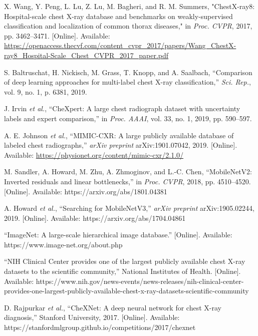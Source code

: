 \documentclass[12pt]{article}
\begin{document}
\begin{thebibliography}{99}
X. Wang, Y. Peng, L. Lu, Z. Lu, M. Bagheri, and R. M. Summers, "ChestX-ray8: Hospital-scale chest X-ray database and benchmarks on weakly-supervised classification and localization of common thorax diseases," in \textit{Proc. CVPR}, 2017, pp. 3462–3471. [Online]. Available: \url{https://openaccess.thecvf.com/content_cvpr_2017/papers/Wang_ChestX-ray8_Hospital-Scale_Chest_CVPR_2017_paper.pdf}

S. Baltruschat, H. Nickisch, M. Grass, T. Knopp, and A. Saalbach, “Comparison of deep learning approaches for multi-label chest X-ray classification,” \textit{Sci. Rep.}, vol. 9, no. 1, p. 6381, 2019.

J. Irvin \textit{et al.}, “CheXpert: A large chest radiograph dataset with uncertainty labels and expert comparison,” in \textit{Proc. AAAI}, vol. 33, no. 1, 2019, pp. 590–597.

A. E. Johnson \textit{et al.}, “MIMIC-CXR: A large publicly available database of labeled chest radiographs,” \textit{arXiv preprint} arXiv:1901.07042, 2019. [Online]. Available: \url{https://physionet.org/content/mimic-cxr/2.1.0/}

M. Sandler, A. Howard, M. Zhu, A. Zhmoginov, and L.-C. Chen, “MobileNetV2: Inverted residuals and linear bottlenecks,” in \textit{Proc. CVPR}, 2018, pp. 4510–4520. [Online]. Available: https://arxiv.org/abs/1801.04381

A. Howard \textit{et al.}, “Searching for MobileNetV3,” \textit{arXiv preprint} arXiv:1905.02244, 2019. [Online]. Available: https://arxiv.org/abs/1704.04861

“ImageNet: A large-scale hierarchical image database.” [Online]. Available: https://www.image-net.org/about.php

“NIH Clinical Center provides one of the largest publicly available chest X-ray datasets to the scientific community,” National Institutes of Health. [Online]. Available: https://www.nih.gov/news-events/news-releases/nih-clinical-center-provides-one-largest-publicly-available-chest-x-ray-datasets-scientific-community

D. Rajpurkar \textit{et al.}, “CheXNet: A deep neural network for chest X-ray diagnosis,” Stanford University, 2017. [Online]. Available: https://stanfordmlgroup.github.io/competitions/2017/chexnet


\end{thebibliography}
\end{document}
